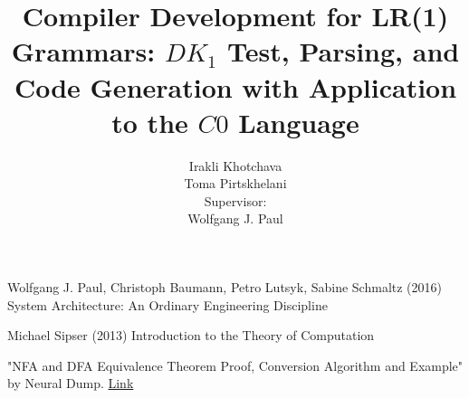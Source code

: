 \documentclass[11pt]{report}
\title{Compiler Development for LR(1) Grammars: \(DK_{1}\) Test, Parsing, and Code Generation with Application to the \(C0\) Language\\ \vspace{10pt}{\Large Kutaisi International University}}
\author{Irakli Khotchava\\Toma Pirtskhelani \vspace{30pt}\\ Supervisor:\\ Wolfgang J. Paul}
\date{}
\begin{document}
    \maketitle

    \tableofcontents
    
    
    

    \begin{thebibliography}{9}
        Wolfgang J. Paul, Christoph Baumann, Petro Lutsyk, Sabine Schmaltz (2016) System Architecture: An Ordinary Engineering Discipline

        Michael Sipser (2013) Introduction to the Theory of Computation

        "NFA and DFA Equivalence Theorem Proof, Conversion Algorithm and Example"
        by Neural Dump. \href{https://neuraldump.net/2017/11/nfa-and-dfa-equivalence-theorem-proof-and-example/}{Link}
    \end{thebibliography}
\end{document}
